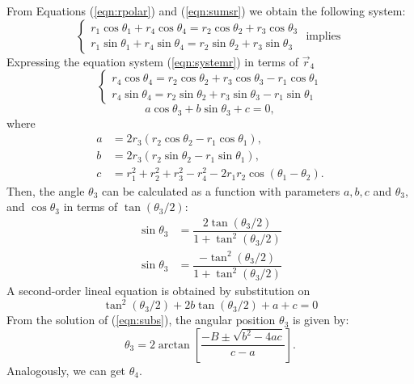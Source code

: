 \documentclass[12pt,letterpape]{article}
\begin{document}
From Equations (\ref{eqn:rpolar}) and  (\ref{eqn:sumsr}) we obtain the following system:
\begin{equation}
	\begin{cases}	
	 	r_1\cos\theta_1 + r_4\cos\theta_4 = r_2\cos\theta_2 + r_3\cos\theta_3 \\
	 	r_1\sin\theta_1 + r_4\sin\theta_4 = r_2\sin\theta_2 + r_3\sin\theta_3 
	\end{cases}
	\text{ implies } 
	\label{eqn:systemr}
\end{equation}
% 
Expressing the equation system (\ref{eqn:systemr}) in terms of $\vec{r}_4$
% 
\begin{equation}
	\begin{cases}	
	 	r_4\cos\theta_4 = r_2\cos\theta_2 + r_3\cos\theta_3 - r_1\cos\theta_1\\
	 	r_4\sin\theta_4 = r_2\sin\theta_2 + r_3\sin\theta_3 - r_1\sin\theta_1
	\end{cases}
	\label{eqn:systemr4}
\end{equation}
% 
% 
\begin{equation}
	a \cos \theta_3 + b\sin\theta_3 + c = 0,
\end{equation}
% 
where
% 
\begin{align*}
	a &= 2r_3 ( r_2\cos\theta_2 - r_1\cos\theta_1 ),\\
	b &= 2r_3 ( r_2\sin\theta_2 - r_1\sin\theta_1 ),\\
	c &= r_1^2 + r_2^2 + r_3^2 - r_4^2 - 2r_1 r_2 \cos( \theta_1 - \theta_2 ).
\end{align*}
% 
Then, the angle $\theta_3$ can be calculated as a function with parameters $a, b, c$ and $\theta_3$, and $\cos\theta_3$ in terms of $\tan (\theta_3 / 2)$:
%
\begin{align}
 	\sin \theta_3 &= \dfrac{2\tan(\theta_3 / 2)}{1 + \tan^2(\theta_3 / 2)}\\
 	\sin \theta_3 &= \dfrac{ - \tan^2(\theta_3 / 2)}{1 + \tan^2(\theta_3 / 2)}
\end{align}
%
A second-order lineal equation is obtained by substitution on
\begin{equation}
	[c - a]\tan^2(\theta_3 / 2) + 2b\tan(\theta_3 / 2) + a + c = 0
	\label{eqn:subs}
\end{equation}
% 
From the solution of (\ref{eqn:subs}), the angular position $\theta_3$ is given by:
\begin{equation}
	\theta_3 = 2\arctan \left[ \dfrac{-B\pm \sqrt{b^2 - 4ac} }{c-a} \right].
	\label{eqn:theta3}
\end{equation}
% 
Analogously, we can get $\theta_4$.
\end{document}
